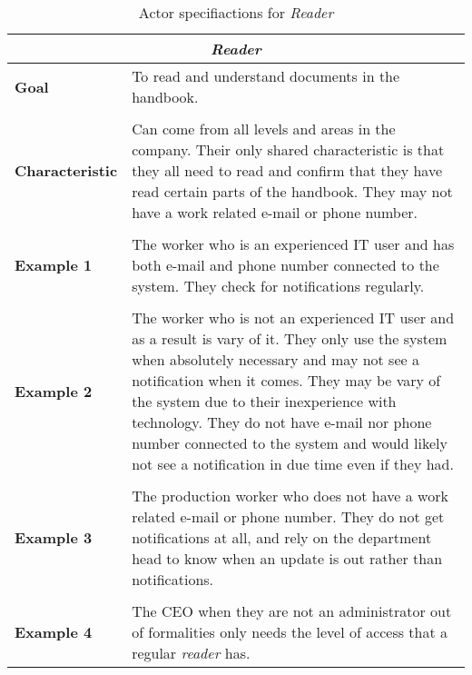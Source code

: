 \begin{table}[H]
	\begin{tabular}{l p{11.3cm}}
		\hline
		\multicolumn{2}{c}{\textbf{\textit{Reader}}}\\
		\hline
		
		\textbf{Goal} & To read and understand documents in the handbook. \\
		&  \\
		
		\textbf{Characteristic} & Can come from all levels and areas in the company.
		Their only shared characteristic is that they all need to read and confirm that they have read certain parts of the handbook.
		They may not have a work related e-mail or phone number.\\
		&  \\
		
		\textbf{Example 1}
		& The worker who is an experienced IT user and has both e-mail and phone number connected to the system.
		They check for notifications regularly.\\
		&  \\
		\textbf{Example 2}
		& The worker who is not an experienced IT user and as a result is vary of it. 
		They only use the system when absolutely necessary and may not see a notification when it comes.
		They may be vary of the system due to their inexperience with technology.
		They do not have e-mail nor phone number connected to the system and would likely not see a notification in due time even if they had.\\
		&  \\
		
		\textbf{Example 3}
		& The production worker who does not have a work related e-mail or phone number. 
		They do not get notifications at all, and rely on the department head to know when an update is out rather than notifications.\\
		&  \\
		
		\textbf{Example 4}
		& The CEO when they are not an administrator out of formalities only needs the level of access that a regular \textit{reader} has.\\		
		
		\hline
	\end{tabular}
	\caption{Actor specifiactions for \textit{Reader}}\label{tab:Actor-read}
\end{table}

